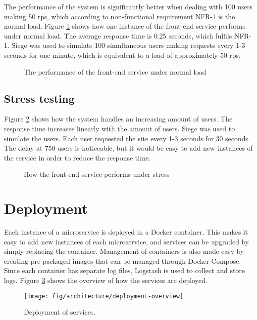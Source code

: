 The performance of the system is significantly better when dealing with 100 users making 50 \acrshort{rps}, which according to non-functional requirement NFR-1 is the normal load. Figure \ref{fig:normal-load} shows how one instance of the front-end service performs under normal load. The average response time is 0.25 seconds, which fulfils NFR-1. Siege was used to simulate 100 simultaneous users making requests every 1-3 seconds for one minute, which is equivalent to a load of approximately 50 \acrshort{rps}.
\begin{figure}[H]
    \centering
    
    \caption{The performance of the front-end service under normal load}\label{fig:normal-load}
\end{figure}

\subsection{Stress testing}\label{subsec:stress-testing}
Figure \ref{fig:stress-testing} shows how the system handles an increasing amount of users. The response time increases linearly with the amount of users. Siege was used to simulate the users. Each user requested the site every 1-3 seconds for 30 seconds. The delay at 750 users is noticeable, but it would be easy to add new instances of the service in order to reduce the response time.
\begin{figure}[H]
    \centering
    
    \caption{How the front-end service performs under stress}\label{fig:stress-testing}
\end{figure}

\section{Deployment}
Each instance of a microservice is deployed in a Docker container. This makes it easy to add new instances of each microservice, and services can be upgraded by simply replacing the container.
Management of containers is also made easy by creating pre-packaged images that can be managed through Docker Compose.
Since each container has separate log files, Logstash is used to collect and store logs. Figure \ref{fig:deploy_arch} shows the overview of how the services are deployed.
\begin{figure}[H]
    \centering
    \texttt{[image: fig/architecture/deployment-overview]}
    \caption{Deployment of services.}\label{fig:deploy_arch}
\end{figure}



